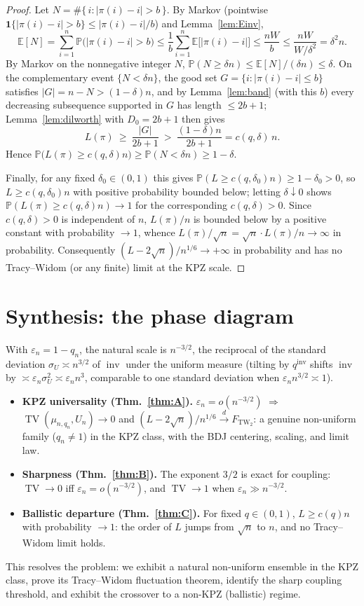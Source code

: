 \documentclass[12pt]{article}
\theoremstyle{definition}
\DeclareMathOperator{\inv}{inv}
\DeclareMathOperator{\TV}{TV}
\newcommand{\TW}{\mathrm{TW}_2}
\newcommand{\E}{\mathbb{E}}
\newcommand{\PP}{\mathbb{P}}
\newcommand{\eps}{\varepsilon}
\begin{document}
\begin{proof}
Let $N=\#\{\,i:|\pi(i)-i|>b\,\}$. By Markov (pointwise $\mathbf 1\{|\pi(i)-i|>b\}\le
|\pi(i)-i|/b$) and Lemma~\ref{lem:Einv},
\[
\E[N]=\sum_{i=1}^n\PP\big(|\pi(i)-i|>b\big)\le\frac1b\sum_{i=1}^n\E\big[|\pi(i)-i|\big]
\le\frac{nW}{b}\le \frac{nW}{W/\delta^2}=\delta^2 n.
\]
By Markov on the nonnegative integer $N$,
$\PP(N\ge \delta n)\le \E[N]/(\delta n)\le \delta$. On the complementary event
$\{N<\delta n\}$, the good set $G=\{i:|\pi(i)-i|\le b\}$ satisfies $|G|=n-N>(1-\delta)n$,
and by Lemma~\ref{lem:band} (with this $b$) every decreasing subsequence supported in
$G$ has length $\le 2b+1$; Lemma~\ref{lem:dilworth} with $D_0=2b+1$ then gives
\[
L(\pi)\ \ge\ \frac{|G|}{2b+1}\ >\ \frac{(1-\delta)n}{2b+1}=c(q,\delta)\,n .
\]
Hence $\PP\big(L(\pi)\ge c(q,\delta)n\big)\ge \PP(N<\delta n)\ge 1-\delta$.

Finally, for any fixed $\delta_0\in(0,1)$ this gives $\PP(L\ge c(q,\delta_0)n)\ge1-\delta_0>0$,
so $L\ge c(q,\delta_0)n$ with positive probability bounded below; letting
$\delta\downarrow0$ shows $\PP(L(\pi)\ge c(q,\delta)n)\to1$ for the corresponding
$c(q,\delta)>0$. Since $c(q,\delta)>0$ is independent of $n$,
$L(\pi)/n$ is bounded below by a positive constant with probability $\to1$, whence
$L(\pi)/\sqrt n=\sqrt n\cdot L(\pi)/n\to\infty$ in probability. Consequently
$(L-2\sqrt n)/n^{1/6}\to+\infty$ in probability and has no Tracy--Widom (or any
finite) limit at the KPZ scale.
\end{proof}

\section{Synthesis: the phase diagram}\label{sec:synth}
With $\eps_n=1-q_n$, the natural scale is $n^{-3/2}$, the reciprocal of the standard
deviation $\sigma_U\asymp n^{3/2}$ of $\inv$ under the uniform measure (tilting by
$q^{\inv}$ shifts $\inv$ by $\asymp\eps_n\sigma_U^2\asymp\eps_n n^3$, comparable to one
standard deviation when $\eps_n n^{3/2}\asymp1$).
\begin{itemize}
\item \textbf{KPZ universality (Thm.~\ref{thm:A}).} $\eps_n=o(n^{-3/2})$ $\Rightarrow$
$\TV(\mu_{n,q_n},U_n)\to0$ and $(L-2\sqrt n)/n^{1/6}\xrightarrow{d}F_{\TW}$: a genuine
non-uniform family ($q_n\ne1$) in the KPZ class, with the BDJ centering, scaling, and
limit law.
\item \textbf{Sharpness (Thm.~\ref{thm:B}).} The exponent $3/2$ is exact for coupling:
$\TV\to0$ iff $\eps_n=o(n^{-3/2})$, and $\TV\to1$ when $\eps_n\gg n^{-3/2}$.
\item \textbf{Ballistic departure (Thm.~\ref{thm:C}).} For fixed $q\in(0,1)$,
$L\ge c(q)n$ with probability $\to1$: the order of $L$ jumps from $\sqrt n$ to $n$, and
no Tracy--Widom limit holds.
\end{itemize}
This resolves the problem: we exhibit a natural non-uniform ensemble in the KPZ class,
prove its Tracy--Widom fluctuation theorem, identify the sharp coupling threshold, and
exhibit the crossover to a non-KPZ (ballistic) regime.
\end{document}
